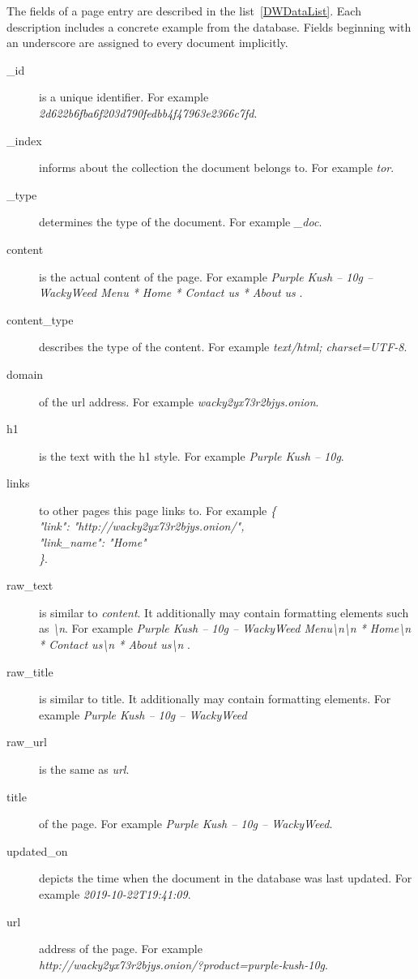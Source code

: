 The fields of a page entry are described in the list~\ref{DWDataList}. Each description includes a concrete example from the database. Fields beginning with an underscore are assigned to every document implicitly.
 \label{DWDataList}
\begin {description}
	\item[\_id] is a unique identifier. For example\\ \textit{2d622b6fba6f203d790fedbb4f47963e2366c7fd}.
	\item[\_index] informs about the collection the document belongs to. For example \textit{tor}. 
	\item[\_type] determines the type of the document. For example \textit{\_doc}.
	\item[content] is the actual content of the page. For example \textit{Purple Kush – 10g – WackyWeed Menu    * Home   * Contact us   * About us }.
	\item[content\_type] describes the type of the content. For example \textit{text/html; charset=UTF-8}.
	\item[domain] of the url address. For example \textit{wacky2yx73r2bjys.onion}.
	\item[h1] is the text with the h1 style. For example \textit{Purple Kush – 10g}.
	\item[links] to other pages this page links to. For example \textit{\{\\
  "link": "http://wacky2yx73r2bjys.onion/",\\
  "link\_name": "Home"\\
\}}.
	\item[raw\_text] is similar to \textit{content}. It additionally may contain formatting elements such as \textit{\textbackslash n}. For example \textit{Purple Kush – 10g – WackyWeed Menu\textbackslash n\textbackslash n  * Home\textbackslash n  * Contact us\textbackslash n  * About us\textbackslash n }.
	\item[raw\_title] is similar to title. It additionally may contain formatting elements. For example \textit{Purple Kush – 10g – WackyWeed}
	\item[raw\_url] is the same as \textit{url}.
	\item[title] of the page. For example \textit{Purple Kush – 10g – WackyWeed}.
	\item[updated\_on] depicts the time when the document in the database was last updated. For example \textit{2019-10-22T19:41:09}.
	\item[url] address of the page. For example \\ \textit{http://wacky2yx73r2bjys.onion/?product=purple-kush-10g}.
\end{description}